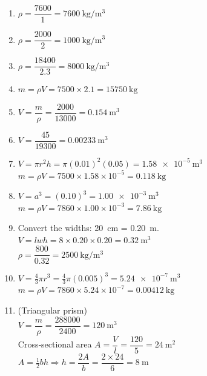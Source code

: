 \documentclass{article}
\begin{document}
\begin{enumerate}
\item $\rho = \dfrac{7600}{1} = \SI{7600}{\kilogram\per\metre\cubed}$

\item $\rho = \dfrac{2000}{2} = \SI{1000}{\kilogram\per\metre\cubed}$

\item $\rho = \dfrac{18400}{2.3} = \SI{8000}{\kilogram\per\metre\cubed}$

\item $m = \rho V = 7500 \times 2.1 = \SI{15750}{\kilogram}$

\item $V = \dfrac{m}{\rho} = \dfrac{2000}{13000} = \SI{0.154}{\metre\cubed}$

\item $V = \dfrac{45}{19300} = \SI{0.00233}{\metre\cubed}$

\item $V = \pi r^{2} h = \pi(0.01)^{2}(0.05) = \SI{1.58e-5}{\metre\cubed}$\\
      $m = \rho V = 7500 \times 1.58\times10^{-5} = \SI{0.118}{\kilogram}$

\item $V = a^{3} = (0.10)^{3} = \SI{1.00e-3}{\metre\cubed}$\\
      $m = \rho V = 7860 \times 1.00\times10^{-3} = \SI{7.86}{\kilogram}$

\item Convert the widths: \SI{20}{\centi\metre} = \SI{0.20}{\metre}.\\
      $V = l w h = 8 \times 0.20 \times 0.20 = \SI{0.32}{\metre\cubed}$\\
      $\rho = \dfrac{800}{0.32} = \SI{2500}{\kilogram\per\metre\cubed}$

\item $V = \tfrac43 \pi r^{3} = \tfrac43 \pi (0.005)^{3} = \SI{5.24e-7}{\metre\cubed}$\\
      $m = \rho V = 7860 \times 5.24\times10^{-7} = \SI{0.00412}{\kilogram}$

\item (Triangular prism)\\
      $V = \dfrac{m}{\rho} = \dfrac{288000}{2400} = \SI{120}{\metre\cubed}$\\
      Cross‐sectional area $A = \dfrac{V}{l} = \dfrac{120}{5} = \SI{24}{\metre\squared}$\\
      $A = \tfrac12 b h \Rightarrow h = \dfrac{2A}{b} = \dfrac{2 \times 24}{6} = \SI{8}{\metre}$


\end{enumerate}
\end{document}
